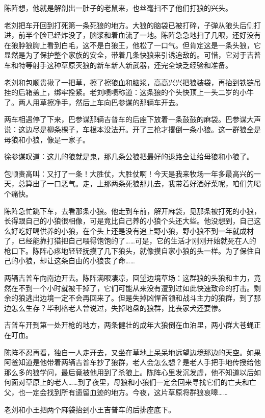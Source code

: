 \par 陈阵想，他就是解剖出一肚子的老鼠来，也丝毫扫不了他们打狼的兴头。
\par 老刘把车开回到打死第一条死狼的地方。大狼的脑袋已被打碎，子弹从狼头后侧打进，前半个脸已经炸没了，脑浆和着血流了一地。陈阵急急地扫了几眼，还好没有在狼脖狼胸上看到白毛，这不是白狼王，他松了一口气。但肯定这是一条头狼，它显然是为了保护整个家族的安全，带着几条快狼来引诱追敌的。可惜，它对于吉普车和特等射手这种草原灭狼的新车新人新武器，还完全缺乏经验和准备。
\par 老刘和包顺贵揪了一把草，擦了擦狼血和脑浆，高高兴兴把狼装袋，再抬到铁链吊挂的后箱盖上，绑牢拴紧。老刘啧啧称道：这条狼的个头快顶上一头二岁的小牛了。两人用草擦净手，然后上车向巴参谋的那辆车开去。
\par 两车相遇停了下来，巴参谋那辆吉普车的后座下放着一条鼓鼓的麻袋。巴参谋大声说：这边尽是柳条棵子，车根本没法开。开了三枪才撂倒一条小狼。这一群狼全是母狼和小狼，像是一家子。
\par 徐参谋叹道：这儿的狼就是鬼，那几条公狼把最好的退路全让给母狼和小狼了。
\par 包顺贵高叫：又打了一条！大胜仗，大胜仗啊！今天是我来牧场一年多最高兴的一天，总算出了一口恶气。走，上那两条死狼那儿去，我带着好酒好菜呢，咱们先喝个痛快。
\par 陈阵急忙跳下车，去看那条小狼。他走到车前，解开麻袋，见那条被打死的小狼，长得跟自己的小狼很相像，可是竟比自己养的小狼个头还大些。他没想到，自己这么好吃好喝供养的小狼，在个头上还是没有追上野小狼，野小狼不到一年就成材了，已经能靠打猎把自己喂得饱饱的了……可是，它的生活才刚刚开始就死在人的枪口下。陈阵心疼地轻轻抚摸了几下狼头，就像摸自家小狼的头一样。为了保住自己的小狼，却让这条自由的小狼丧了命……
\par 两辆吉普车向南边开去。陈阵满眼凄凉，回望边境草场：这群狼的头狼和主力，竟然在不到一个小时就被干掉了，它们可能从来没有遭到过如此快速致命的打击。剩余的狼逃出边境一定不会再回来了。但是失掉凶悍首领和战斗主力的狼群，到了那边怎么生存？毕利格老人曾说过，失掉地盘的狼群，比丧家犬还要惨。
\par 吉普车开到第一处开枪的地方，两条健壮的成年大狼倒在血泊里，两小群大苍蝇正在叮血。
\par 陈阵不忍再看，独自一人走开去，又坐在草地上呆呆地远望边境那边的天空。如果阿爸知道是他带着两辆吉普车抄了狼群，老人会怎么想？是老人手把手地传授给他那么多的狼学问，最后竟被他用到了杀狼上。陈阵心里发沉发虚，他不知道以后如何面对草原上的老人……到了夜里，母狼和小狼们一定会回来寻找它们的亡夫和亡父，也一定会找到所有遗留血迹的地方。今夜，这片草原将群狼哀嗥……
\par 老刘和小王把两个麻袋抬到小王吉普车的后排座底下。
